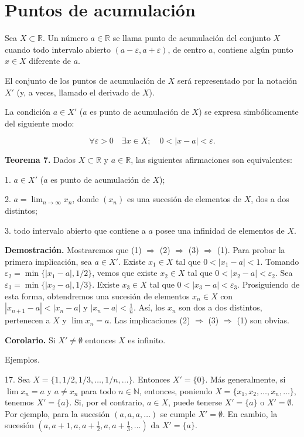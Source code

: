 \documentclass[12pt,oneside]{book}
\begin{document}
\section{Puntos de acumulación}

Sea \(X \subset \mathbb{R}\). Un número \(a \in \mathbb{R}\) se llama punto de acumulación del conjunto \(X\) cuando todo intervalo abierto \((a - \varepsilon, a + \varepsilon)\), de centro \(a\), contiene algún punto \(x \in X\) diferente de \(a\).

El conjunto de los puntos de acumulación de \(X\) será representado por la notación \(X'\) (y, a veces, llamado el derivado de \(X\)).

La condición \(a \in X'\) (\(a\) es punto de acumulación de \(X\)) se expresa simbólicamente del siguiente modo:

\[
\forall \varepsilon > 0 \quad \exists x \in X; \quad 0 < |x - a| < \varepsilon.
\]

\textbf{Teorema 7.} Dados \(X \subset \mathbb{R}\) y \(a \in \mathbb{R}\), las siguientes afirmaciones son equivalentes:

1. \(a \in X'\) (\(a\) es punto de acumulación de \(X\));

2. \(a = \lim_{n \to \infty} x_n\), donde \((x_n)\) es una sucesión de elementos de \(X\), dos a dos distintos;

3. todo intervalo abierto que contiene a \(a\) posee una infinidad de elementos de \(X\).

\textbf{Demostración.} Mostraremos que (1) \(\Rightarrow\) (2) \(\Rightarrow\) (3) \(\Rightarrow\) (1). Para probar la primera implicación, sea \(a \in X'\). Existe \(x_1 \in X\) tal que \(0 < |x_1 - a| < 1\). Tomando \(\varepsilon_2 = \min\{|x_1 - a|, 1/2\}\), vemos que existe \(x_2 \in X\) tal que \(0 < |x_2 - a| < \varepsilon_2\). Sea \(\varepsilon_3 = \min\{|x_2 - a|, 1/3\}\). Existe \(x_3 \in X\) tal que \(0 < |x_3 - a| < \varepsilon_3\). Prosiguiendo de esta forma, obtendremos una sucesión de elementos \(x_n \in X\) con \(|x_{n+1} - a| < |x_n - a|\) y \(|x_n - a| < \frac{1}{n}\). Así, los \(x_n\) son dos a dos distintos, pertenecen a \(X\) y \(\lim x_n = a\). Las implicaciones (2) \(\Rightarrow\) (3) \(\Rightarrow\) (1) son obvias.

\textbf{Corolario.} Si \(X' \neq \emptyset\) entonces \(X\) es infinito.

Ejemplos.

17. Sea \(X = \{1, 1/2, 1/3, \dots, 1/n, \dots\}\). Entonces \(X' = \{0\}\). Más generalmente, si \(\lim x_n = a\) y \(a \neq x_n\) para todo \(n \in \mathbb{N}\), entonces, poniendo \(X = \{x_1, x_2, \dots, x_n, \dots\}\), tenemos \(X' = \{a\}\). Si, por el contrario, \(a \in X\), puede tenerse \(X' = \{a\}\) o \(X' = \emptyset\). Por ejemplo, para la sucesión \((a, a, a, \dots)\) se cumple \(X' = \emptyset\). En cambio, la sucesión \((a, a+1, a, a+\frac{1}{2}, a, a+\frac{1}{3}, \dots)\) da \(X' = \{a\}\).
\end{document}
